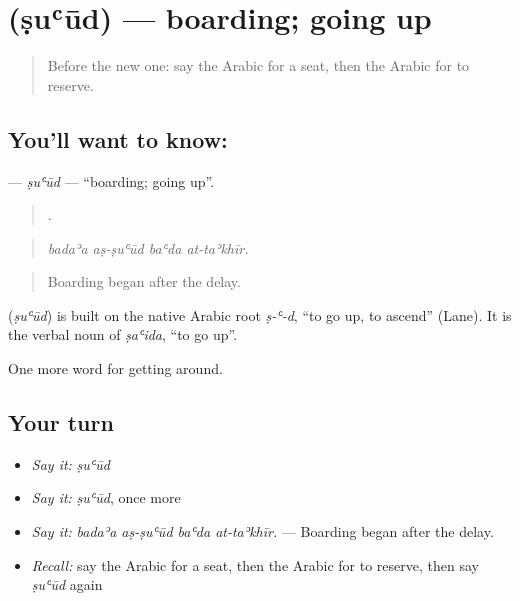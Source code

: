 \section[\texorpdfstring{\ar{صعود} (ṣuʿūd)}{صعود (ṣuʿūd)}]{ (ṣuʿūd) — boarding; going up}

\label{lesson:AR-C423-suud}



\begin{quote}
Before the new one: say the Arabic for a seat, then the Arabic for to reserve.
\end{quote}

\subsection*{You'll want to know: }
\textbf{} — \emph{ṣuʿūd} — \textquotedblleft{}boarding; going up\textquotedblright{}.

\begin{quote}
   .
\end{quote}

\begin{quote}
\emph{badaʾa aṣ-ṣuʿūd baʿda at-taʾkhīr.}
\end{quote}

\begin{quote}
Boarding began after the delay.
\end{quote}

\begin{cousinweb}
\textbf{} (\emph{ṣuʿūd}) is built on the native Arabic root \emph{ṣ-ʿ-d}, \textquotedblleft{}to go up, to ascend\textquotedblright{} (Lane). It is the verbal noun of \emph{ṣaʿida}, \textquotedblleft{}to go up\textquotedblright{}.
\end{cousinweb}

\begin{grammarlens}[title={What you've built}]
One more word for getting around.
\end{grammarlens}

\subsection*{Your turn}
\begin{itemize}
\raggedright
  \item \emph{Say it:} \emph{ṣuʿūd}
  \item \emph{Say it:} \emph{ṣuʿūd}, once more
  \item \emph{Say it:} \emph{badaʾa aṣ-ṣuʿūd baʿda at-taʾkhīr.} — Boarding began after the delay.
  \item \emph{Recall:} say the Arabic for a seat, then the Arabic for to reserve, then say \emph{ṣuʿūd} again
\end{itemize}

